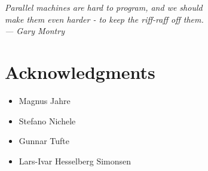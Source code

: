 
\begin{flushright}{\slshape    %
    Parallel machines are hard to program, and we should\\
    make them even harder - to keep the riff-raff off them.\\ \medskip
    ---  Gary Montry}  %
\end{flushright}

\bigskip

\begingroup
\let\clearpage\relax
\let\cleardoublepage\relax
\let\cleardoublepage\relax
\chapter*{Acknowledgments}
\bigskip

\begin{itemize} %
\item Magnus Jahre
\item Stefano Nichele
\item Gunnar Tufte
\item Lars-Ivar Hesselberg Simonsen %
\end{itemize}
\endgroup
